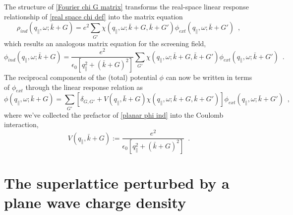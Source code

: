 \documentclass[submission, Phys]{SciPost}
\newcommand{\lp}{\left(}
\newcommand{\lb}{\left[}
\newcommand{\rb}{\right]}
\newcommand{\rp}{\right)}
\newcommand{\e}{\epsilon}
\begin{document}
The structure of \eqref{Fourier chi G matrix} transforms the real-space linear response relationship of \eqref{real space chi def} into the matrix equation
\begin{equation}
    \label{planar linear response}
     \rho_{ind}(q_\parallel,\omega;\bar k+G) = e^2\sum_{G'}\chi(q_\parallel,\omega;\bar k+G, \bar k+G')
     \phi_{ext}(q_\parallel,\omega;\bar k+G')
     \,\,\,,
\end{equation}
which results an analogous matrix equation for the screening field,
\begin{equation}
    \label{planar phi ind}
     \phi_{ind}(q_\parallel,\omega;\bar k+G) = \frac{e^2}{\e_0\lb q_\parallel^2+\lp\bar k+G\rp^2\rb} \sum_{G'}\chi(q_\parallel,\omega;\bar k+G, \bar k+G')
     \phi_{ext}(q_\parallel,\omega;\bar k+G')
     \,\,\,.
\end{equation}
The reciprocal components of the (total) potential $\phi$ can now be written in terms of $\phi_{ext}$ through the linear response relation as
\begin{equation}
    \label{planar phi to phi ext relation}
    \phi(q_\parallel,\omega;\bar k+G) 
    =
    \sum_{G'}
    \lb
    \delta_{G,G'}
    +
    V(q_\parallel,\bar k+G)
    \chi(q_\parallel,\omega;\bar k+G, \bar k+G')
    \rb
    \phi_{ext}(q_\parallel,\omega;\bar k+ G')
    \,\,\,,
\end{equation}
where we've collected the prefactor of \eqref{planar phi ind} into the Coulomb interaction,
\begin{equation}
    \label{V def}
    V(q_\parallel,\bar k+G):=
    \frac{e^2}{\e_0\lb q_\parallel^2+\lp\bar k+G\rp^2\rb}
    \,\,\,.
\end{equation}
































\section{The superlattice perturbed by a plane wave charge density}
\end{document}
